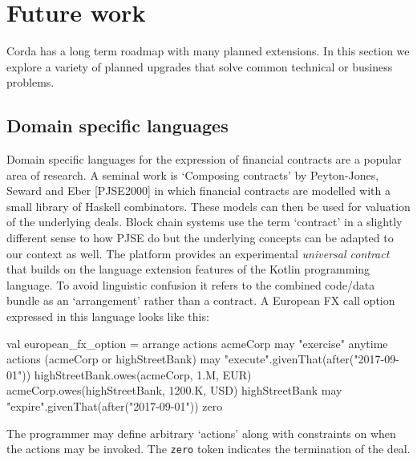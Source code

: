 \documentclass{article}
\begin{document}
\section{Future work}

Corda has a long term roadmap with many planned extensions. In this section we explore a variety of planned upgrades
that solve common technical or business problems.

\subsection{Domain specific languages}

Domain specific languages for the expression of financial contracts are a popular area of research. A seminal work
is `Composing contracts' by Peyton-Jones, Seward and Eber [PJSE2000\cite{PeytonJones:2000:CCA:357766.351267}] in
which financial contracts are modelled with a small library of Haskell combinators. These models can then be used
for valuation of the underlying deals. Block chain systems use the term `contract' in a slightly different sense to
how PJSE do but the underlying concepts can be adapted to our context as well. The platform provides an
experimental \emph{universal contract} that builds on the language extension features of the Kotlin programming
language. To avoid linguistic confusion it refers to the combined code/data bundle as an `arrangement' rather than
a contract. A European FX call option expressed in this language looks like this:

\begin{kotlincode}
    val european_fx_option = arrange {
        actions {
            acmeCorp may {
                "exercise" anytime {
                    actions {
                        (acmeCorp or highStreetBank) may {
                            "execute".givenThat(after("2017-09-01")) {
                                highStreetBank.owes(acmeCorp, 1.M, EUR)
                                acmeCorp.owes(highStreetBank, 1200.K, USD)
                            }
                        }
                    }
                }
            }
            highStreetBank may {
                "expire".givenThat(after("2017-09-01")) {
                    zero
                }
            }
        }
    }
\end{kotlincode}

The programmer may define arbitrary `actions' along with constraints on when the actions may be invoked. The
\texttt{zero} token indicates the termination of the deal.
\end{document}
